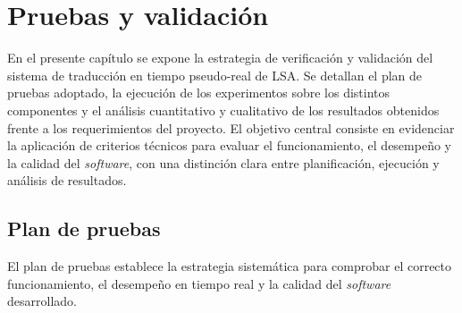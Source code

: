 \chapter{Pruebas y validación}
\label{cap:pruebas_validacion}

En el presente capítulo se expone la estrategia de verificación y validación del sistema de traducción en tiempo pseudo-real de LSA. Se detallan el plan de pruebas adoptado, la ejecución de los experimentos sobre los distintos componentes y el análisis cuantitativo y cualitativo de los resultados obtenidos frente a los requerimientos del proyecto. El objetivo central consiste en evidenciar la aplicación de criterios técnicos para evaluar el funcionamiento, el desempeño y la calidad del \textit{software}, con una distinción clara entre planificación, ejecución y análisis de resultados.

\section{Plan de pruebas}
\label{sec:plan_pruebas}

El plan de pruebas establece la estrategia sistemática para comprobar el correcto funcionamiento, el desempeño en tiempo real y la calidad del \textit{software} desarrollado.

